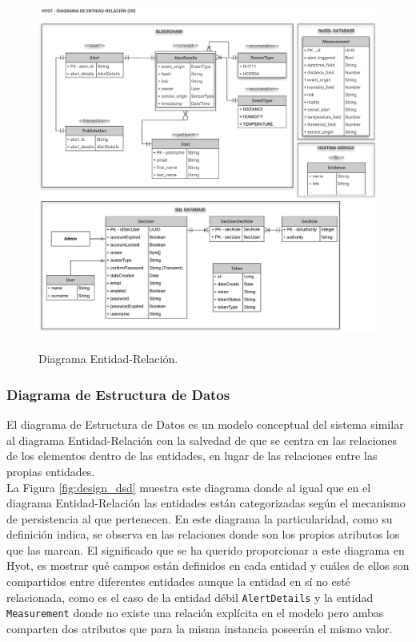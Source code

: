 \documentclass[12pt,a4paper, twoside]{report}
\begin{document}
	\begin{figure}[!ht]   
		\caption{Diagrama Entidad-Relación.} 
		\begin{center} 
			\includegraphics[width=17cm,height=11cm]{Images/design/p_er} \\
			\label{fig:design_er} 
		\end{center}  
	\end{figure}
	
	\subsubsection{Diagrama de Estructura de Datos}
	
	El diagrama de Estructura de Datos es un modelo conceptual del sistema similar al diagrama Entidad-Relación con la salvedad de que se centra en las relaciones de los elementos dentro de las entidades, en lugar de las relaciones entre las propias entidades. \\
	
	La Figura \ref{fig:design_dsd} muestra este diagrama donde al igual que en el diagrama Entidad-Relación las entidades están categorizadas según el mecanismo de persistencia al que pertenecen. En este diagrama la particularidad, como su definición indica, se observa en las relaciones donde son los propios atributos los que las marcan. El significado que se ha querido proporcionar a este diagrama en Hyot, es mostrar qué campos están definidos en cada entidad y cuáles de ellos son compartidos entre diferentes entidades aunque la entidad en sí no esté relacionada, como es el caso de la entidad débil \texttt{AlertDetails} y la entidad \texttt{Measurement} donde no existe una relación explícita en el modelo pero ambas comparten dos atributos que para la misma instancia poseerán el mismo valor.
	
\end{document}
